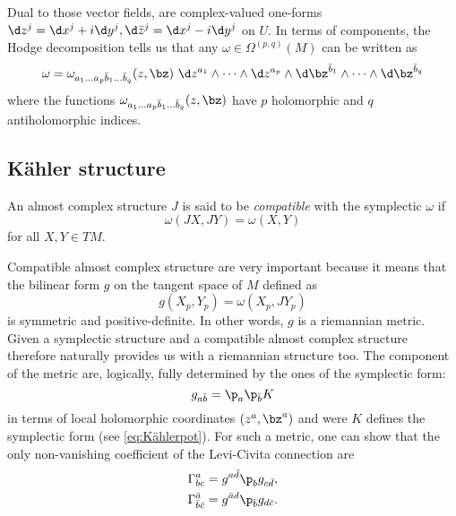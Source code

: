 \documentclass{worksheetclass}
\begin{document}
        Dual to those vector fields, are complex-valued one-forms $\d z^j=\d x^j+i\d y^j,\d\bar{z}^j=\d x^j-i\d y^j$ on $U$. In terms of components, the Hodge decomposition tells us that any $\omega\in\Omega^{(p,q)}(M)$ can be written as
        \begin{equation}
            \omega = \omega_{a_1\dots a_p\bar{b}_1\dots\bar{b}_q}(z,\bz)~\d z^{a_1}\wedge\dots\wedge \d z^{a_p}\wedge \d\bz^{\bar{b}_1}\wedge\dots\wedge \d\bz^{\bar{b}_q}
        \end{equation}
        where the functions $\omega_{a_1\dots a_p\bar{b}_1\dots\bar{b}_q}(z,\bz)$ have $p$ holomorphic and $q$ antiholomorphic indices. 
        
        

    \subsection{Kähler structure}

        \begin{defn}
            An almost complex structure $J$ is said to be \emph{compatible} with the symplectic $\omega$ if 
            \begin{equation*}
                \omega(JX,JY) = \omega(X,Y)
            \end{equation*}
            for all $X,Y\in TM$.
        \end{defn}
        Compatible almost complex structure are very important because it means that the bilinear form $g$ on the tangent space of $M$ defined as
        \begin{equation}
            g(X_p,Y_p)=\omega(X_p,JY_p)
        \end{equation}
        is symmetric and positive-definite. In other words, $g$ is a riemannian metric. Given a symplectic structure and a compatible almost complex structure therefore naturally provides us with a riemannian structure too. The component of the metric are, logically, fully determined by the ones of the symplectic form:
        \begin{equation}
            g_{a\bar{b}}=\p_a\p_{\bar{b}}K
        \end{equation}
        in terms of local holomorphic coordinates $(z^a,\bz^a)$ and were $K$ defines the symplectic form (see \eqref{eq:Kählerpot}). For such a metric, one can show that the only non-vanishing coefficient of the Levi-Civita connection are
        \begin{align}
            \Gamma^a_{bc} &= g^{a\bar{d}}\p_bg_{c\bar{d}},\\
            \Gamma^{\bar{a}}_{\bar{b}\bar{c}} &= g^{\bar{a}d}\p_{\bar{b}}g_{d\bar{c}}.
        \end{align}
        
\end{document}
